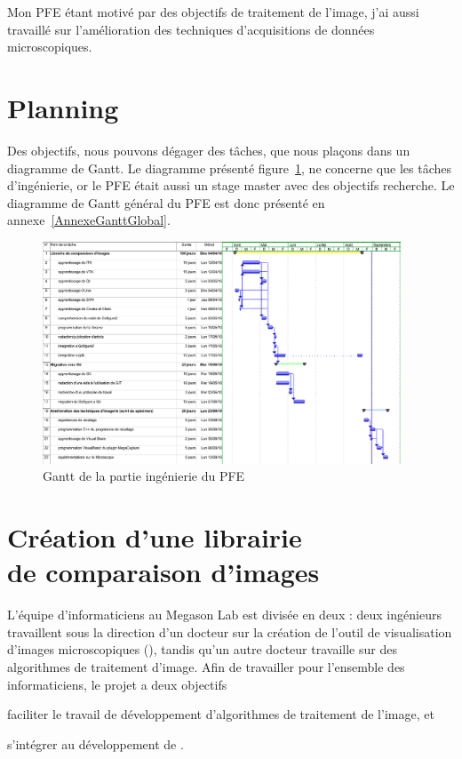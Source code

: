 Mon PFE étant motivé par des objectifs de traitement de l'image, j'ai aussi travaillé sur l'amélioration
 des techniques d'acquisitions de données microscopiques.
 
 
\section*{Planning} 
 
Des objectifs, nous pouvons dégager des tâches, que nous plaçons dans un diagramme de Gantt. Le diagramme présenté figure~\ref{fig:GanttPFEInge}, ne concerne que les tâches d'ingénierie, or le PFE était aussi un stage master avec des objectifs recherche. Le diagramme de Gantt général du PFE est donc présenté en annexe~\ref{AnnexeGanttGlobal}.
 
\begin{figure}[h]
\begin{center}
\leavevmode
\includegraphics[angle=-90, width=0.95\textwidth]{pictures/GanttPFEInge}
\end{center}
\caption{Gantt de la partie ingénierie du PFE}
\label{fig:GanttPFEInge}
\end{figure}



\section{Création d'une librairie\\ de comparaison d'images}

L'équipe d'informaticiens au Megason Lab est divisée en deux : deux ingénieurs travaillent sous la direction d'un docteur sur la
 création de l'outil de visualisation d'images microscopiques (\gofigure), tandis qu'un autre docteur travaille sur
 des algorithmes de traitement d'image. Afin de travailler pour l'ensemble des informaticiens, le projet a deux objectifs
\begin{inparaenum}[(i)]
  \item faciliter le travail de développement d'algorithmes de traitement de l'image, et 
  \item s'intégrer au développement de {\gofigure}.
\end{inparaenum}

